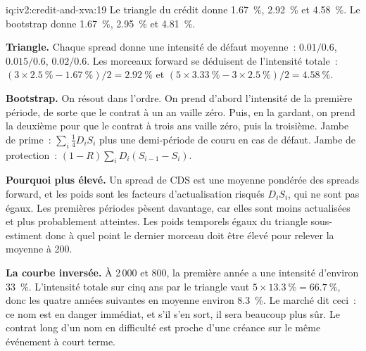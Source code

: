 \begin{solution}{iq:iv2:credit-and-xva:19}
Le triangle du crédit donne 1.67~\%, 2.92~\% et 4.58~\%. Le bootstrap donne 1.67~\%, 2.95~\% et 4.81~\%.

\textbf{Triangle.} Chaque spread donne une intensité de défaut moyenne~: $0.01/0.6$, $0.015/0.6$, $0.02/0.6$. Les morceaux forward se déduisent de l'intensité totale~: $(3 \times 2.5~\% - 1.67~\%)/2 = 2.92~\%$ et $(5 \times 3.33~\% - 3 \times 2.5~\%)/2 = 4.58~\%$.

\textbf{Bootstrap.} On résout dans l'ordre. On prend d'abord l'intensité de la première période, de sorte que le contrat à un an vaille zéro. Puis, en la gardant, on prend la deuxième pour que le contrat à trois ans vaille zéro, puis la troisième. Jambe de prime~: $\sum_i \tfrac14 D_i S_i$ plus une demi-période de couru en cas de défaut. Jambe de protection~: $(1 - R)\sum_i D_i (S_{i-1} - S_i)$.

\textbf{Pourquoi plus élevé.} Un spread de CDS est une moyenne pondérée des spreads forward, et les poids sont les facteurs d'actualisation risqués $D_iS_i$, qui ne sont pas égaux. Les premières périodes pèsent davantage, car elles sont moins actualisées et plus probablement atteintes. Les poids temporels égaux du triangle sous-estiment donc à quel point le dernier morceau doit être élevé pour relever la moyenne à 200.

\textbf{La courbe inversée.} À 2\,000 et 800, la première année a une intensité d'environ 33~\%. L'intensité totale sur cinq ans par le triangle vaut $5 \times 13.3~\% = 66.7~\%$, donc les quatre années suivantes en moyenne environ 8.3~\%. Le marché dit ceci~: ce nom est en danger immédiat, et s'il s'en sort, il sera beaucoup plus sûr. Le contrat long d'un nom en difficulté est proche d'une créance sur le même événement à court terme.

\end{solution}

